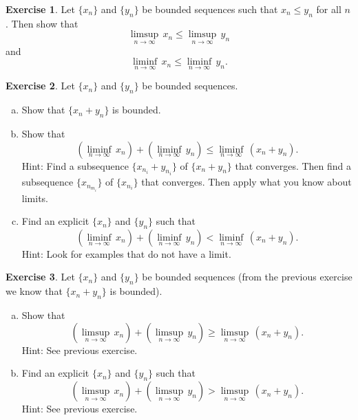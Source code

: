 \documentclass[12pt]{book}
\theoremstyle{plain}
\theoremstyle{remark}
\theoremstyle{definition}
\theoremstyle{exercise}
\newtheorem{exercise}{Exercise}[section]
\theoremstyle{example}
\begin{document}
\begin{exercise}
Let $\{ x_n \}$ and $\{ y_n \}$ be bounded sequences such that
$x_n \leq y_n$ for all $n$.  Then show that
\begin{equation*}
\limsup_{n\to\infty} \, x_n \leq
\limsup_{n\to\infty} \, y_n
\end{equation*}
and
\begin{equation*}
\liminf_{n\to\infty} \, x_n \leq
\liminf_{n\to\infty} \, y_n .
\end{equation*}
\end{exercise}

\begin{exercise}
Let $\{ x_n \}$ and $\{ y_n \}$ be bounded sequences.
\begin{enumerate}[a)]
\item
Show that $\{ x_n + y_n \}$ is bounded.
\item
Show that
\begin{equation*}
(\liminf_{n\to \infty}\, x_n)
+
(\liminf_{n\to \infty}\, y_n)
\leq
\liminf_{n\to \infty}\, (x_n+y_n) .
\end{equation*}
Hint: Find a subsequence $\{ x_{n_i}+y_{n_i} \}$ of $\{ x_n + y_n \}$
that converges.
Then find a subsequence $\{ x_{n_{m_i}} \}$ of $\{ x_{n_i} \}$ that converges.
Then apply what you know about limits.
\item
Find an explicit $\{ x_n \}$ and $\{ y_n \}$ such that
\begin{equation*}
(\liminf_{n\to \infty}\, x_n)
+
(\liminf_{n\to \infty}\, y_n)
<
\liminf_{n\to \infty}\, (x_n+y_n) .
\end{equation*}
Hint: Look for examples that do not have a limit.
\end{enumerate}
\end{exercise}

\begin{samepage}
\begin{exercise}
Let $\{ x_n \}$ and $\{ y_n \}$ be bounded sequences (from the previous
exercise we know that $\{ x_n + y_n \}$ is bounded).
\begin{enumerate}[a)]
\item
Show that
\begin{equation*}
(\limsup_{n\to \infty}\, x_n)
+
(\limsup_{n\to \infty}\, y_n)
\geq
\limsup_{n\to \infty}\, (x_n+y_n) .
\end{equation*}
Hint: See previous exercise.
\item
Find an explicit $\{ x_n \}$ and $\{ y_n \}$ such that
\begin{equation*}
(\limsup_{n\to \infty}\, x_n)
+
(\limsup_{n\to \infty}\, y_n)
>
\limsup_{n\to \infty}\, (x_n+y_n) .
\end{equation*}
Hint: See previous exercise.
\end{enumerate}
\end{exercise}
\end{samepage}
\end{document}
